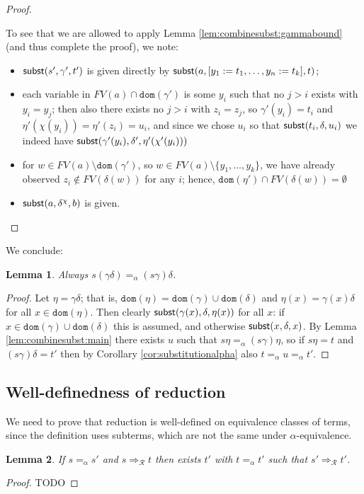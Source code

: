 \documentclass{lmcs}
\theoremstyle{theorem}\newtheorem{theorem}{Theorem}
\theoremstyle{theorem}\newtheorem{lemma}[theorem]{Lemma}
\theoremstyle{theorem}\newtheorem{corollary}[theorem]{Corollary}
\theoremstyle{definition}\newtheorem{definition}[theorem]{Definition}
\theoremstyle{definition}\newtheorem{example}[theorem]{Example}
\newcommand{\Rules}{\mathcal{R}}
\newcommand{\FV}{\mathit{FV}}
\newcommand{\domain}{\mathtt{dom}}
\newcommand{\bvar}{y}
\newcommand{\cvar}{z}
\newcommand{\arrz}{\Rightarrow}
\newcommand{\arr}[1]{\arrz_{#1}}
\begin{document}
\begin{proof}
{\begin{itemize}
      To see that we are allowed to apply Lemma \ref{lem:combinesubst:gammabound} (and thus complete the proof),
      we note:
      \begin{itemize}
      \item $\mathsf{subst}(s',\gamma',t')$ is given directly by $\subrel{a,[\bvar_1:=t_1,\dots,\bvar_n:=t_k],t}$;
      \item each variable in $\FV(a) \cap \domain(\gamma')$ is some $\bvar_i$ such that no $j > i$ exists
        with $\bvar_i = \bvar_j$; then also there exists no $j > i$ with $\cvar_i = \cvar_j$, so
        $\gamma'(\bvar_i) = t_i$ and $\eta'(\chi(\bvar_i)) = \eta'(\cvar_i) = u_i$, and since
        we chose $u_i$ so that $\mathsf{subst}(t_i,\delta,u_i)$ we indeed have
        $\subrel{\gamma'(\bvar_i),\delta',\eta'(\chi'(\bvar_i))}$
      \item for $w \in \FV(a) \setminus \domain(\gamma')$, so $w \in \FV(a) \setminus \{\bvar_1,\dots,\bvar_k\}$,
        we have already observed $\cvar_i \notin \FV(\delta(w))$ for any $i$;
        hence, $\domain(\eta') \cap \FV(\delta(w)) = \emptyset$
      \item $\mathsf{subst}(a,\delta^\chi,b)$ is given.
        \qedhere
      \end{itemize}
    \end{itemize}
}
\end{proof}

We conclude:

\begin{lemma}\label{lem:combinesubst}
Always $s(\gamma\delta) =_\alpha (s\gamma)\delta$.
\end{lemma}

\begin{proof}
Let $\eta = \gamma\delta$; that is, $\domain(\eta) = \domain(\gamma) \cup \domain(\delta)$ and
$\eta(x) = \gamma(x)\delta$ for all $x \in \domain(\eta)$.  Then clearly $\mathsf{subst}(\gamma(x),
\delta,\eta(x))$ for all $x$:
if $x \in \domain(\gamma) \cup \domain(\delta)$ this is assumed,
and otherwise $\mathsf{subst}(x,\delta,x)$.
By Lemma \ref{lem:combinesubst:main} there exists $u$ such that $s\eta =_\alpha (s\gamma)\eta$,
so if $s\eta = t$ and $(s\gamma)\delta = t'$ then by Corollary \ref{cor:substitutionalpha}
also $t =_\alpha u =_\alpha t'$.
\end{proof}

\subsection{Well-definedness of reduction}

We need to prove that reduction is well-defined on equivalence classes of terms, since the
definition uses subterms, which are not the same under $\alpha$-equivalence.

\begin{lemma}\label{lem:reductionwelldefined}
If $s =_\alpha s'$ and $s \arr{\Rules} t$ then exists $t'$ with $t =_\alpha t'$ such that
$s' \arr{\Rules} t'$.
\end{lemma}

\begin{proof}
TODO
\end{proof}
\end{document}
